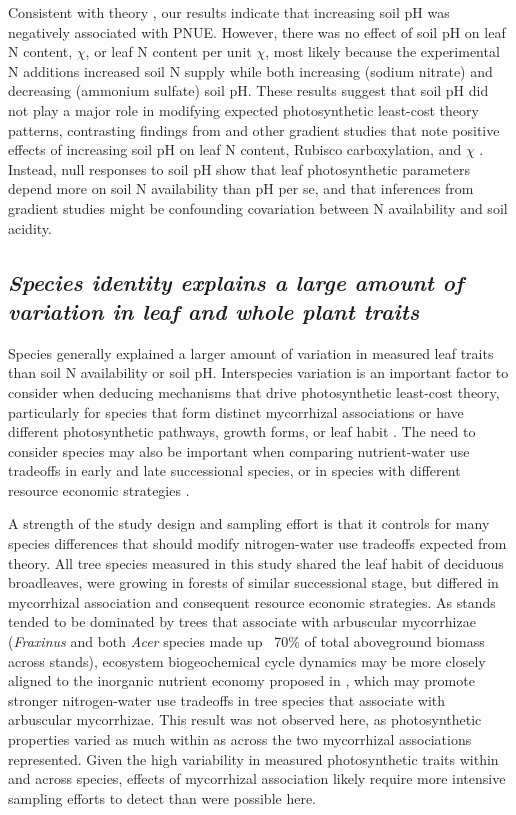 Consistent with theory , our results indicate that increasing soil pH was negatively associated with PNUE. However, there was no effect of soil pH on leaf N content, $\chi$, or leaf N content per unit $\chi$, most likely because the experimental N additions increased soil N supply while both increasing (sodium nitrate) and decreasing (ammonium sulfate) soil pH. These results suggest that soil pH did not play a major role in modifying expected photosynthetic least-cost theory patterns, contrasting findings from  and other gradient studies that note positive effects of increasing soil pH on leaf N content, Rubisco carboxylation, and $\chi$ . Instead, null responses to soil pH show that leaf photosynthetic parameters depend more on soil N availability than pH per se, and that inferences from gradient studies might be confounding covariation between N availability and soil acidity.

\subsection{\textit{Species identity explains a large amount of variation in leaf and whole plant traits}}
Species generally explained a larger amount of variation in measured leaf traits than soil N availability or soil pH. Interspecies variation is an important factor to consider when deducing mechanisms that drive photosynthetic least-cost theory, particularly for species that form distinct mycorrhizal associations or have different photosynthetic pathways, growth forms, or leaf habit . The need to consider species may also be important when comparing nutrient-water use tradeoffs in early and late successional species, or in species with different resource economic strategies .
    
A strength of the study design and sampling effort is that it controls for many species differences that should modify nitrogen-water use tradeoffs expected from theory. All tree species measured in this study shared the leaf habit of deciduous broadleaves, were growing in forests of similar successional stage, but differed in mycorrhizal association and consequent resource economic strategies. As stands tended to be dominated by trees that associate with arbuscular mycorrhizae (\textit{Fraxinus} and both \textit{Acer} species made up ~70\% of total aboveground biomass across stands), ecosystem biogeochemical cycle dynamics may be more closely aligned to the inorganic nutrient economy proposed in , which may promote stronger nitrogen-water use tradeoffs in tree species that associate with arbuscular mycorrhizae. This result was not observed here, as photosynthetic properties varied as much within as across the two mycorrhizal associations represented. Given the high variability in measured photosynthetic traits within and across species, effects of mycorrhizal association likely require more intensive sampling efforts to detect than were possible here.
    
